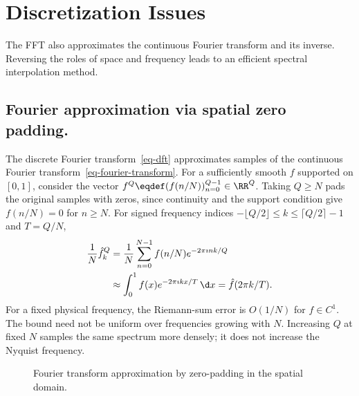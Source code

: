 \section{Discretization Issues}
\label{sec-fourier-discretization}

The FFT also approximates the continuous Fourier transform and its inverse. Reversing the roles of space and frequency leads to an efficient spectral interpolation method.


                                                
\subsection{Fourier approximation via spatial zero padding.}

The discrete Fourier transform~\eqref{eq-dft} approximates samples of the continuous Fourier transform~\eqref{eq-fourier-transform}. For a sufficiently smooth $f$ supported on $[0,1]$, consider the vector $f^Q \eqdef (f(n/N))_{n=0}^{Q-1} \in \RR^Q$. Taking $Q\geq N$ pads the original samples with zeros, since continuity and the support condition give $f(n/N)=0$ for $n\geq N$.
For signed frequency indices $-\lfloor Q/2\rfloor\leq k\leq\lceil Q/2\rceil-1$ and $T=Q/N$,
\begin{align*}
 \frac1N\hat f_k^Q
 &=\frac1N\sum_{n=0}^{N-1}f(n/N)e^{-2\pi\imath nk/Q}\\
 &\approx\int_0^1f(x)e^{-2\pi\imath kx/T}\,\d x
 =\hat f(2\pi k/T).
\end{align*}
For a fixed physical frequency, the Riemann-sum error is $O(1/N)$ for $f\in C^1$. The bound need not be uniform over frequencies growing with $N$. Increasing $Q$ at fixed $N$ samples the same spectrum more densely; it does not increase the Nyquist frequency.
                                                                                                                                                                                                                                                

\begin{figure}[tbp]
\centering
{}
\caption{Fourier transform approximation by zero-padding in the spatial domain.}
\label{fig-padding-spacial}
\end{figure}


                                                
